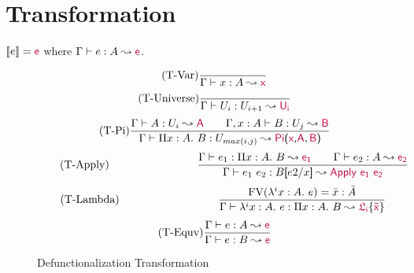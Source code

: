 


\section{Transformation}

${[\![ e ]\!]} = {\color{purple}{\mathsf{e}}}$ where $\Gamma \vdash e : A \leadsto {\color{purple}{\mathsf{e}}}$.

\begin{figure}
	\begin{equation}
		\tag{T-Var}
		\frac
			{}
			{\Gamma \vdash x : A \leadsto {\color{purple}{\mathsf{x}}}}
	\end{equation} \hspace{0.5cm}
	\begin{equation}
		\tag{T-Universe}
		\frac
			{}
			{\Gamma \vdash U_i : U_{i+1} \leadsto {\color{purple}{\mathsf{U_i}}}}
	\end{equation} \hspace{0.5cm}
	\begin{equation}
		\tag{T-Pi}
		\frac
			{\Gamma \vdash A : U_i \leadsto {\color{purple}{\mathsf{A}}} \qquad \Gamma, x : A \vdash B : U_j \leadsto {\color{purple}{\mathsf{B}}}
			}
			{\Gamma \vdash \Pi x:A.\ B : U_{max(i, j)} \leadsto \mathsf{\color{purple}Pi\color{black}\textsf{(}\color{purple}x\color{black}\textsf{,} \color{purple}A\color{black}, \color{purple}B\color{black}\textsf{)} }}
	\end{equation} \hspace{0.5cm}
	\begin{equation}
		\tag{T-Apply}
		\qquad\qquad\qquad\qquad
		\frac
			{\Gamma \vdash e_1 : \Pi x:A.\ B \leadsto {\color{purple}{\mathsf{e_1}}} \qquad \Gamma \vdash e_2 : A \leadsto {\color{purple}{\mathsf{e_2}}}}
			{\Gamma \vdash e_1 \ e_2 : B\textsf{[}e2\slash x\textsf{]} \leadsto {\color{purple}{\mathsf{Apply\ e_1 \ e_2}}}}
	\end{equation} \hspace{0.5cm}
	\begin{equation}
		\tag{T-Lambda}
		\qquad\qquad\qquad\qquad\quad
		\frac
			{ \text{FV}(\lambda^{i}x:A.\ e) = \bar{x} : \bar{A} }
			{ \Gamma \vdash \lambda^{i}x:A.\ e : \Pi x:A.\ B \leadsto {\color{purple}{\mathsf{\mathfrak{L}_i}}}\{{\color{purple}{\mathsf{\bar{x}}}}\}}
	\end{equation} \hspace{0.5cm}
	\begin{equation}
		\tag{T-Equv}
		\frac
			{\Gamma \vdash e : A \leadsto {\color{purple}{\mathsf{e}}}}
			{\Gamma \vdash e : B \leadsto {\color{purple}{\mathsf{e}}}}
	\end{equation}
	\caption{Defunctionalization Transformation}
    \label{fig:dcc transformation}
\end{figure}


